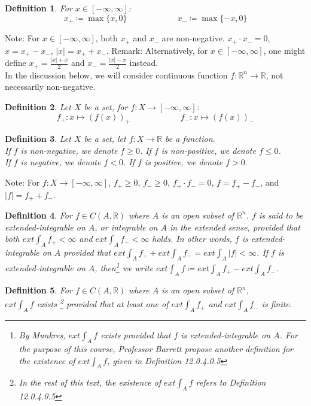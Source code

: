 \documentclass[11pt,oneside]{book}
\theoremstyle{break}
\theoremstyle{break}
\newtheorem{defn}{Definition}[corL]
\newcommand{\R}{\mathbb{R}}
\newcommand{\note}{\color{red}Note: \color{black}}
\newcommand{\remark}{\color{blue}Remark: \color{black}}
\begin{document}
\begin{defn}
For $x \in [-\infty, \infty]$: $$x_+ \coloneqq \max\{x,0\}\qquad\qquad\qquad x_- \coloneqq \max\{-x,0\}$$
\end{defn}
\note For $x\in[-\infty, \infty] $, both $x_+$ and $x_-$ are non-negative. $x_+ \cdot x_- = 0$, $x = x_+ - x_-$, $|x| = x_++x_-$. 
\remark Alternatively, for $x\in[-\infty, \infty] $, one might define $x_+ = \frac{|x|+x}{2}$ and $x_- = \frac{|x|-x}{2}$ instead.\\

In the discussion below, we will consider continuous function $f:\R^n \to \R$, not necessarily non-negative.

\begin{defn}
Let $X$ be a set, for $f:X \to [-\infty, \infty]$:
$$f_+: x\mapsto(f(x))_+ \qquad\qquad\qquad f_-: x\mapsto (f(x))_-$$ 
\end{defn}

\begin{defn}
Let $X$ be a set, let $f:X \to \R$ be a function. \\
If $f$ is non-negative, we denote $f\geq 0$. If $f$ is non-positive, we denote $f\leq 0$.\\
If $f$ is negative, we denote $f< 0$. If $f$ is positive, we denote $f> 0$.
\end{defn}



\note For $f:X \to [-\infty, \infty]$,  $f_+ \geq 0$, $f_- \geq 0$, $f_+\cdot f_- = 0$, $f = f_+ - f_-$, and $|f| = f_+ + f_-$.



\begin{defn}
For $f \in C(A,\R)$ where $A$ is an open subset of $\R^n$. $f$ is said to be extended-integrable on $A$, or integrable on $A$ in the extended sense, provided that both $ext \int_A f_+< \infty$ and $ext \int_A f_- < \infty$ holds. In other words, $f$ is extended-integrable on $A$ provided that $ext \int_A f_+ + ext \int_A f_- = ext \int_A |f| < \infty$. If $f$ is extended-integrable on $A$, then\footnote{By Munkres, $ext \int_A f$ exists provided that $f$ is extended-integrable on $A$. For the purpose of this course, Professor Barrett propose another definition for the existence of $ext \int_A f$, given in Definition 12.0.4.0.5} we write $ext \int_A f \coloneqq ext \int_A f_+ - ext \int_A f_-$. 
\end{defn}

\begin{defn}
For $f \in C(A,\R)$ where $A$ is an open subset of $\R^n$, \\$ext \int_A f$ exists \footnote[1]{In the rest of this text, the existence of $ext \int_A f$ refers to Definition 12.0.4.0.5} provided that at least one of $ext \int_A f_+$ and $ext \int_A f_-$ is finite.
\end{defn}
\end{document}
